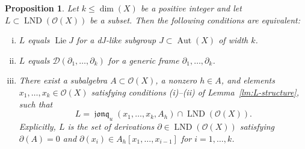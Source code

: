 \documentclass[12pt,a4paper]{amsart}
\theoremstyle{plain}
\newtheorem{proposition}[theorem]{Proposition}
\theoremstyle{definition}
\theoremstyle{remark}
\def\Aut{\operatorname{Aut}}
\def\LND{\operatorname{LND}}
\def\Lie{\operatorname{Lie}}
\def\cO{{\mathcal O}}
\DeclareMathOperator{\jonq}{\mathfrak{jonq}}
\begin{document}
\begin{proposition}\label{pr:dJ-like=Jdi}
   Let $k\le \dim(X)$ be a positive integer and let $L\subset\LND(\cO(X))$ be a subset. 
   Then the following conditions are equivalent:
   \begin{enumerate}[(i)]
      \item $L$ equals $\Lie J$ for a dJ-like subgroup $J\subset\Aut(X)$ of width $k$.
      \item $L$ equals $\mathcal{D}(\partial_1,\ldots,\partial_k)$ for a generic frame $\partial_1,\ldots,\partial_k$.
       \item There exist a subalgebra $A\subset\cO(X)$, a nonzero $h\in A$, and elements $x_1,\ldots,x_k\in\cO(X)$ satisfying conditions (i)--(ii) of Lemma~\ref{lm:L-structure}, such that
   \[L=\jonq_u(x_1,\ldots,x_k,A_h)\cap\LND(\cO(X)).\]
   Explicitly, $L$ is the set of derivations $\partial\in\LND(\cO(X))$ satisfying $\partial(A)=0$ and $\partial(x_i)\in A_h[x_1,\ldots,x_{i-1}]$ for $i=1,\ldots,k$.
   \end{enumerate}
\end{proposition}
\end{document}
